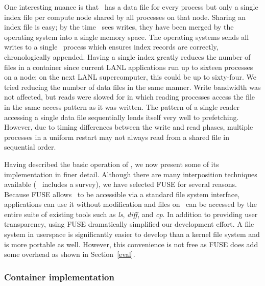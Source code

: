 
One interesting nuance is that \plfs\ has a data file for every process but
only a single index file per compute node shared by all processes on that node.
Sharing an index file is easy; by the time \plfs\ sees writes, they have been
merged by the operating system into a single memory space. The operating
systems sends all writes to a single \plfs\ process which ensures index records
are correctly, chronologically appended.  Having a single index greatly reduces
the number of files in a container since current LANL applications run up to
sixteen processes on a node; on the next LANL supercomputer, this could be up
to sixty-four. We tried reducing the number of data files in the same manner.
Write bandwidth was not affected, but reads were slowed for  in which reading processes access the file in the same access pattern
as it was written.  The pattern of a single reader accessing a single data file
sequentially lends itself very well to prefetching.  However, due to timing
differences between the write and read phases, multiple processes in a uniform
restart may not always read from a shared file in sequential order.

Having described the basic operation of \plfs, we now present some of its
implementation in finer detail.  Although there are many interposition
techniques available (~\cite{bypass} includes a survey), we have selected FUSE
for several reasons. Because FUSE allows \plfs\ to be accessible via a standard
file system interface, applications can use it without modification and files on
\plfs\ can be accessed by the entire suite of existing tools such as
\textit{ls}, \textit{diff}, and \textit{cp}. In addition to providing user
transparency, using FUSE dramatically simplified our development effort. A file
system in userspace is significantly easier to develop than a kernel file
system and is more portable as well. However, this convenience is not free as
FUSE does add some overhead as shown in Section~\ref{eval}. 

\subsubsection{Container implementation}


